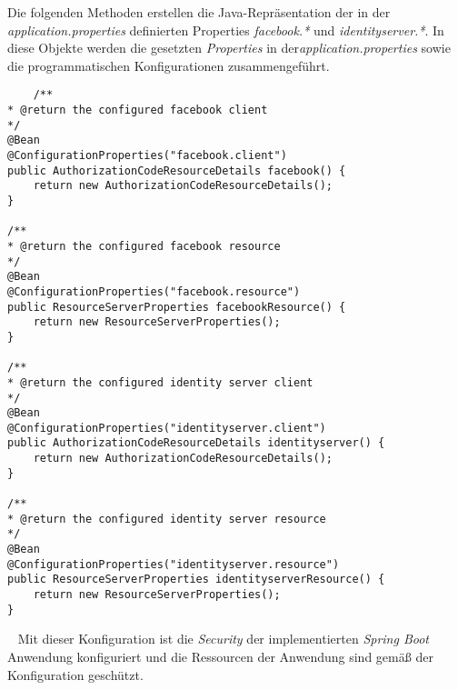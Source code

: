 Die folgenden Methoden erstellen die Java-Repräsentation der in der \emph{application.properties} definierten Properties \emph{facebook.*} und \emph{identityserver.*}. In diese Objekte werden die gesetzten \emph{Properties} in der\emph{application.properties} sowie die programmatischen Konfigurationen zusammengeführt.
\begin{verbatim}
    /**
* @return the configured facebook client
*/
@Bean
@ConfigurationProperties("facebook.client")
public AuthorizationCodeResourceDetails facebook() {
	return new AuthorizationCodeResourceDetails();
}

/**
* @return the configured facebook resource
*/
@Bean
@ConfigurationProperties("facebook.resource")
public ResourceServerProperties facebookResource() {
	return new ResourceServerProperties();
}

/**
* @return the configured identity server client
*/
@Bean
@ConfigurationProperties("identityserver.client")
public AuthorizationCodeResourceDetails identityserver() {
	return new AuthorizationCodeResourceDetails();
}

/**
* @return the configured identity server resource
*/
@Bean
@ConfigurationProperties("identityserver.resource")
public ResourceServerProperties identityserverResource() {
	return new ResourceServerProperties();
}
\end{verbatim}
\ \newline
Mit dieser Konfiguration ist die \emph{Security} der implementierten \emph{Spring Boot} Anwendung konfiguriert und die Ressourcen der Anwendung sind gemäß der Konfiguration geschützt.

\ \newpage





